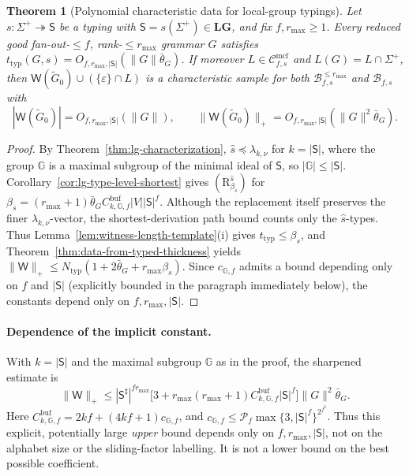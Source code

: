 \documentclass[11pt]{article}
\numberwithin{equation}{section}
\theoremstyle{plain}
\newtheorem{theorem}{Theorem}[section]
\theoremstyle{definition}
\theoremstyle{remark}
\newcommand{\Wit}{\mathsf{W}}
\newcommand{\Cmcf}[2]{\mathcal{C}^{\mathrm{mcf}}_{#1,#2}}
\newcommand{\eps}{\varepsilon}
\theoremstyle{plain}
\begin{document}
\begin{theorem}[Polynomial characteristic data for local-group typings]
\label{thm:local-group-polydata}
Let $s:\Sigma^+\twoheadrightarrow\mathsf S$ be a typing with
$\mathsf S=s(\Sigma^+)\in\mathbf{LG}$, and fix $f,r_{\max}\ge1$.
Every reduced good fan-out-$\le f$,
rank-$\le r_{\max}$ grammar $G$ satisfies
$t_{\mathrm{typ}}(G,s)=O_{f,r_{\max},|\mathsf S|}(\|G\|\bar\theta_G)$.  If moreover
$L\in\Cmcf{f}{s}$ and $L(G)=L\cap\Sigma^+$, then
$\Wit(\widetilde G_0)\cup(\{\eps\}\cap L)$ is a characteristic sample for both
$\mathcal B^{\le r_{\max}}_{f,s}$ and $\mathcal B_{f,s}$ with
\[
 |\Wit(\widetilde G_0)|=O_{f,r_{\max},|\mathsf S|}(\|G\|),\qquad
 \|\Wit(\widetilde G_0)\|_+=O_{f,r_{\max},|\mathsf S|}(\|G\|^2\bar\theta_G).
\]
\end{theorem}

\begin{proof}
By Theorem~\ref{thm:lg-characterization}, $\widehat s\preceq\lambda_{k,\nu}$
for $k=|\mathsf S|$, where the group $\mathbb G$ is a maximal subgroup of
the minimal ideal of $\mathsf S$, so $|{\mathbb G}|\le|\mathsf S|$.
Corollary~\ref{cor:lg-type-level-shortest} gives
$(\mathrm R_{\beta_s}^{\widehat s})$ for
$\beta_s=(r_{\max}+1)\bar\theta_G
C^{\mathrm{buf}}_{k,{\mathbb G},f}|V||\mathsf S|^f$.
Although the replacement itself preserves the finer $\lambda_{k,\nu}$-vector,
the shortest-derivation path bound counts only the $\widehat s$-types.
Thus Lemma~\ref{lem:witness-length-template}(i) gives
$t_{\mathrm{typ}}\le\beta_s$, and
Theorem~\ref{thm:data-from-typed-thickness} yields
$\|\Wit\|_+\le N_{\mathrm{typ}}(1+2\bar\theta_G+r_{\max}\beta_s)$.
Since $c_{{\mathbb G},f}$ admits a bound depending only on $f$ and
$|\mathsf S|$ (explicitly bounded in the paragraph immediately below),
the constants depend only on $f,r_{\max},|\mathsf S|$.
\end{proof}

\paragraph{Dependence of the implicit constant.}
With $k=|\mathsf S|$ and the maximal subgroup $\mathbb G$ as in the proof,
the sharpened estimate is
\[
 \|\Wit\|_+\le |\mathsf S^\sharp|^{fr_{\max}}
 \bigl[3+r_{\max}(r_{\max}+1)
 C^{\mathrm{buf}}_{k,{\mathbb G},f}|\mathsf S|^f\bigr]
 \|G\|^2\bar\theta_G.
\]
Here $C^{\mathrm{buf}}_{k,{\mathbb G},f}=
2kf+(4kf+1)c_{{\mathbb G},f}$, and
$c_{{\mathbb G},f}\le\mathcal P_f
\max\{3,|\mathsf S|^f\}^{2^{f^2}}$.
Thus this explicit, potentially large \emph{upper} bound depends only on
$f,r_{\max},|\mathsf S|$, not on the alphabet size or the sliding-factor
labelling.  It is not a lower bound on the best possible coefficient.
\end{document}
